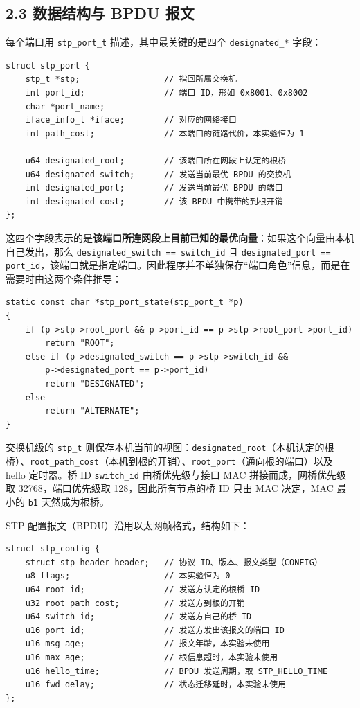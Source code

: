 \documentclass[UTF8,12pt,a4paper,fontset=fandol]{ctexart}
\begin{document}
\subsection*{2.3 数据结构与 BPDU 报文}

每个端口用 \texttt{stp\_port\_t} 描述，其中最关键的是四个 \texttt{designated\_*} 字段：

\begin{verbatim}
struct stp_port {
    stp_t *stp;                 // 指回所属交换机
    int port_id;                // 端口 ID，形如 0x8001、0x8002
    char *port_name;
    iface_info_t *iface;        // 对应的网络接口
    int path_cost;              // 本端口的链路代价，本实验恒为 1

    u64 designated_root;        // 该端口所在网段上认定的根桥
    u64 designated_switch;      // 发送当前最优 BPDU 的交换机
    int designated_port;        // 发送当前最优 BPDU 的端口
    int designated_cost;        // 该 BPDU 中携带的到根开销
};
\end{verbatim}

这四个字段表示的是\textbf{该端口所连网段上目前已知的最优向量}：如果这个向量由本机自己发出，那么 \texttt{designated\_switch == switch\_id} 且 \texttt{designated\_port == port\_id}，该端口就是指定端口。因此程序并不单独保存“端口角色”信息，而是在需要时由这两个条件推导：

\begin{verbatim}
static const char *stp_port_state(stp_port_t *p)
{
    if (p->stp->root_port && p->port_id == p->stp->root_port->port_id)
        return "ROOT";
    else if (p->designated_switch == p->stp->switch_id &&
        p->designated_port == p->port_id)
        return "DESIGNATED";
    else
        return "ALTERNATE";
}
\end{verbatim}

交换机级的 \texttt{stp\_t} 则保存本机当前的视图：\texttt{designated\_root}（本机认定的根桥）、\texttt{root\_path\_cost}（本机到根的开销）、\texttt{root\_port}（通向根的端口）以及 hello 定时器。桥 ID \texttt{switch\_id} 由桥优先级与接口 MAC 拼接而成，网桥优先级取 32768，端口优先级取 128，因此所有节点的桥 ID 只由 MAC 决定，MAC 最小的 \texttt{b1} 天然成为根桥。

STP 配置报文（BPDU）沿用以太网帧格式，结构如下：

\begin{verbatim}
struct stp_config {
    struct stp_header header;   // 协议 ID、版本、报文类型（CONFIG）
    u8 flags;                   // 本实验恒为 0
    u64 root_id;                // 发送方认定的根桥 ID
    u32 root_path_cost;         // 发送方到根的开销
    u64 switch_id;              // 发送方自己的桥 ID
    u16 port_id;                // 发送方发出该报文的端口 ID
    u16 msg_age;                // 报文年龄，本实验未使用
    u16 max_age;                // 根信息超时，本实验未使用
    u16 hello_time;             // BPDU 发送周期，取 STP_HELLO_TIME
    u16 fwd_delay;              // 状态迁移延时，本实验未使用
};
\end{verbatim}
\end{document}
